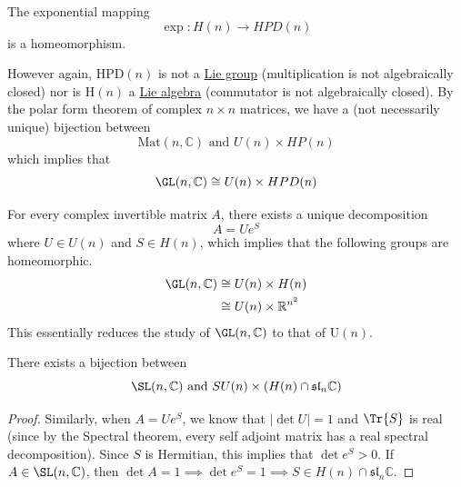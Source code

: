   \begin{lemma}
    \label{thm:exphntohpdn-is-a-homeomorphism}
    The exponential mapping
    \begin{equation}
      \exp: H(n) \rightarrow HPD(n)
    \end{equation}
    is a homeomorphism. 
  \end{lemma}

  However again, HPD$(n)$ is not a \hyperref[def:lie-group]{Lie group} (multiplication is not algebraically closed) nor is H$(n)$ a \hyperref[def:lie-algebra]{Lie algebra} (commutator is not algebraically closed). By the polar form theorem of complex $n \times n$ matrices, we have a (not necessarily unique) bijection between
  \begin{equation}
    \text{Mat}(n, \mathbb{C}) \text{ and } U(n) \times HP(n)
  \end{equation}
  which implies that
  \begin{equation}
    \GL(n, \mathbb{C}) \cong U(n) \times HPD (n)
  \end{equation}

  \begin{corollary}
    \label{thm:complex-polar-decomposition}
    For every complex invertible matrix $A$, there exists a unique decomposition
    \begin{equation}
      A = U e^S
    \end{equation}
    where $U \in U(n)$ and $S \in H(n)$, which implies that the following groups are homeomorphic. 
    \begin{align*}
      \GL(n, \mathbb{C}) & \cong U(n) \times H(n) \\
      & \cong U(n) \times \mathbb{R}^{n^2}
    \end{align*} 
    This essentially reduces the study of $\GL(n, \mathbb{C})$ to that of U$(n)$. 
  \end{corollary}

  \begin{corollary}
    \label{thm:polar-decomposition-of-slnc}
    There exists a bijection between 
    \begin{equation}
      \SL(n, \mathbb{C}) \text{ and } SU(n) \times (H(n) \cap \mathfrak{sl}_n \mathbb{C})
    \end{equation}
  \end{corollary}
  \begin{proof}
    Similarly, when $A = U e^S$, we know that $|\det{U}| = 1$ and $\Tr{S}$ is real (since by the Spectral theorem, every self adjoint matrix has a real spectral decomposition). Since $S$ is Hermitian, this implies that $\det{e^S} > 0$. If $A \in \SL(n, \mathbb{C})$, then $\det{A} = 1 \implies \det{e^S} = 1 \implies S \in H(n) \cap \mathfrak{sl}_n \mathbb{C}$. 
  \end{proof}

